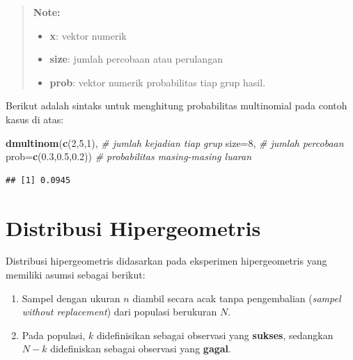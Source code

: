 \documentclass[]{book}
\newenvironment{Shaded}{\begin{snugshade}}{\end{snugshade}}
\newcommand{\KeywordTok}[1]{\textcolor[rgb]{0.13,0.29,0.53}{\textbf{#1}}}
\newcommand{\DataTypeTok}[1]{\textcolor[rgb]{0.13,0.29,0.53}{#1}}
\newcommand{\DecValTok}[1]{\textcolor[rgb]{0.00,0.00,0.81}{#1}}
\newcommand{\FloatTok}[1]{\textcolor[rgb]{0.00,0.00,0.81}{#1}}
\newcommand{\CommentTok}[1]{\textcolor[rgb]{0.56,0.35,0.01}{\textit{#1}}}
\newcommand{\NormalTok}[1]{#1}
\providecommand{\tightlist}{%
  \setlength{\itemsep}{0pt}\setlength{\parskip}{0pt}}
\begin{document}
\begin{quote}
\textbf{Note: }

\begin{itemize}
\tightlist
\item
  \textbf{x}: vektor numerik
\item
  \textbf{size}: jumlah percobaan atau perulangan
\item
  \textbf{prob}: vektor numerik probabilitas tiap grup hasil.
\end{itemize}
\end{quote}

Berikut adalah sintaks untuk menghitung probabilitas multinomial pada
contoh kasus di atas:

\begin{Shaded}
\begin{Highlighting}[]
\KeywordTok{dmultinom}\NormalTok{(}\KeywordTok{c}\NormalTok{(}\DecValTok{2}\NormalTok{,}\DecValTok{5}\NormalTok{,}\DecValTok{1}\NormalTok{), }\CommentTok{# jumlah kejadian tiap grup }
          \DataTypeTok{size=}\DecValTok{8}\NormalTok{, }\CommentTok{# jumlah percobaan}
          \DataTypeTok{prob=}\KeywordTok{c}\NormalTok{(}\FloatTok{0.3}\NormalTok{,}\FloatTok{0.5}\NormalTok{,}\FloatTok{0.2}\NormalTok{)) }\CommentTok{# probabilitas masing-masing luaran}
\end{Highlighting}
\end{Shaded}

\begin{verbatim}
## [1] 0.0945
\end{verbatim}

\section{Distribusi Hipergeometris}\label{distribusi-hipergeometris}

Distribusi hipergeometris didasarkan pada eksperimen hipergeometris yang
memiliki asumsi sebagai berikut:

\begin{enumerate}
\def\labelenumi{\arabic{enumi}.}
\tightlist
\item
  Sampel dengan ukuran \(n\) diambil secara acak tanpa pengembalian
  (\emph{sampel without replacement}) dari populasi berukuran \(N\).
\item
  Pada populasi, \(k\) didefinisikan sebagai observasi yang
  \textbf{sukses}, sedangkan \(N-k\) didefiniskan sebagai observasi yang
  \textbf{gagal}.
\end{enumerate}
\end{document}
